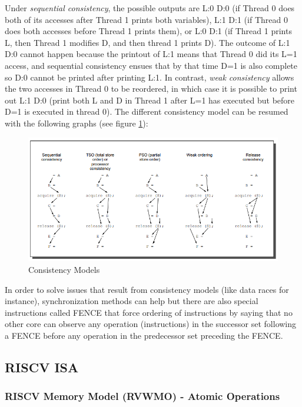\documentclass[10pt,letterpaper]{article}
\begin{document}
Under \textit{sequential consistency}, the possible outputs are L:0 D:0 (if Thread 0 does both of its accesses after Thread 1 prints both variables), L:1 D:1 (if Thread 0 does both accesses before Thread 1 prints them), or L:0 D:1 (if Thread 1 prints L, then Thread 1 modifies D, and then thread 1 prints D). The outcome of L:1 D:0 cannot happen because the printout of L:1 means that Thread 0 did its L=1 access, and sequential consistency ensues that by that time D=1 is also complete so D:0 cannot be printed after printing L:1. In contrast, \textit{weak consistency} allows the two accesses in Thread 0 to be reordered, in which case it is possible to print out L:1 D:0 (print both L and D in Thread 1 after L=1 has executed but before D=1 is executed in thread 0). The different consistency model can be resumed with the following graphs (see figure \ref{fig:consistency_model}):

\begin{figure}[H]
\centering
\includegraphics[width=15cm]{img/multi_proc/consistency_models.PNG}
\caption{Consistency Models \cite{book}}
\label{fig:consistency_model}
\end{figure}

In order to solve issues that result from consistency models (like data races for instance), synchronization methods can help but there are also special instructions called FENCE that force ordering of instructions by saying that no other core can observe any operation (instructions) in the successor set following a FENCE before any operation in the predecessor set preceding the FENCE.

\subsection{RISCV ISA}

\subsubsection{RISCV Memory Model (RVWMO) - Atomic Operations}
\end{document}
